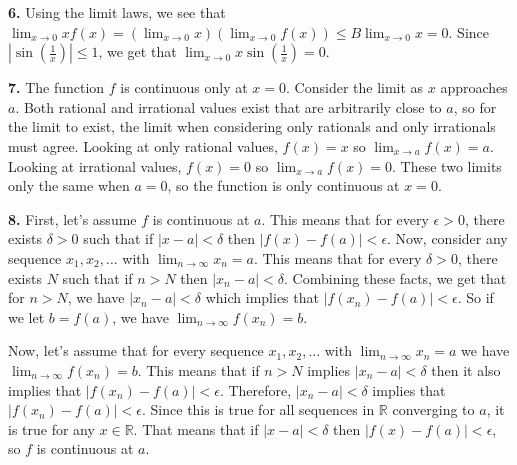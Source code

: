 \documentclass{article}
\begin{document}
\textbf{6.} Using the limit laws, we see that $\displaystyle\lim_{x \to 0} xf(x) = (\lim_{x \to 0}x)(\lim_{x \to 0} f(x)) \le B\lim_{x \to 0}x = 0$. Since $|\sin\left(\frac{1}{x}\right)| \le 1$, we get that $\displaystyle\lim_{x\to 0} x\sin\left(\frac{1}{x}\right) = 0$.
\newline

\textbf{7.} The function $f$ is continuous only at $x = 0$. Consider the limit as $x$ approaches $a$. Both rational and irrational values exist that are arbitrarily close to $a$, so for the limit to exist, the limit when considering only rationals and only irrationals must agree. Looking at only rational values, $f(x) = x$ so $\displaystyle\lim_{x \to a} f(x) = a$. Looking at irrational values, $f(x) = 0$ so $\displaystyle\lim_{x \to a}f(x) = 0$. These two limits only the same when $a = 0$, so the function is only continuous at $x = 0$.
\newline

\textbf{8.} First, let's assume $f$ is continuous at $a$. This means that for every $\epsilon > 0$, there exists $\delta > 0$ such that if $|x - a| < \delta$ then $|f(x) - f(a)| < \epsilon$. Now, consider any sequence $x_1, x_2, \ldots$ with $\displaystyle\lim_{n \to \infty} x_n = a$. This means that for every $\delta > 0$, there exists $N$ such that if $n > N$ then $|x_n - a| < \delta$. Combining these facts, we get that for $n > N$, we have $|x_n - a| < \delta$ which implies that $|f(x_n) - f(a)| < \epsilon$. So if we let $b = f(a)$, we have $\displaystyle\lim_{n\to \infty} f(x_n) = b$.
\newline

Now, let's assume that for every sequence $x_1, x_2, \ldots$ with $\displaystyle\lim_{n\to \infty} x_n = a$ we have $\displaystyle\lim_{n\to \infty} f(x_n) = b$. This means that if $n > N$ implies $|x_n - a| < \delta$ then it also implies that $|f(x_n) - f(a)| < \epsilon$.  Therefore, $|x_n - a| < \delta$ implies that $|f(x_n) - f(a)| < \epsilon$. Since this is true for all sequences in $\mathbb{R}$ converging to $a$, it is true for any $x \in \mathbb{R}$. That means that if $|x - a| < \delta$ then $|f(x) - f(a)| < \epsilon$, so $f$ is continuous at $a$.
\end{document}
